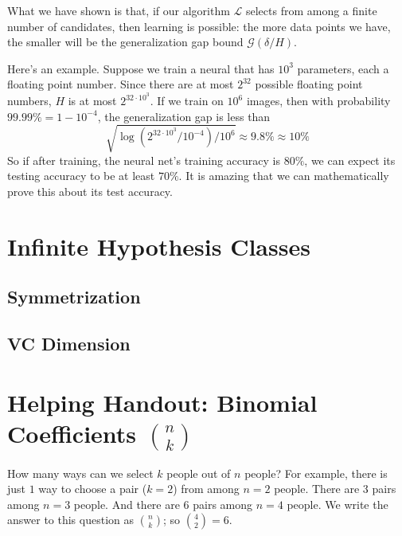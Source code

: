 \documentclass{article}
\newcommand{\Gg}{\mathcal{G}}
\newcommand{\Ll}{\mathcal{L}}
\begin{document}
            What we have shown is that, if our algorithm $\Ll$ selects from among
            a finite number of candidates, then learning is possible: the
            more data points we have, the smaller will be the generalization
            gap bound $\Gg(\delta/H)$.

            Here's an example.  Suppose we train a neural that has $10^3$
            parameters, each a floating point number.  Since there are at most
            $2^{32}$ possible floating point numbers, $H$ is at most
            $2^{32\cdot 10^3}$.  If we train on $10^6$ images, then with
            probability $99.99\%=1-10^{-4}$, the generalization gap is less
            than
            $$
                \sqrt{\log(2^{32\cdot 10^3}/10^{-4})/10^6}
                \approx 9.8\%
                \approx 10\%
            $$
            So if after training, the neural net's training accuracy is $80\%$,
            we can expect its testing accuracy to be at least $70\%$.  It is
            amazing that we can mathematically prove this about its test
            accuracy.

    \section{Infinite Hypothesis Classes}
        \subsection{Symmetrization}
        \subsection{VC Dimension}

    \section{}
    \section{}
    \section{}

    \section*{Helping Handout: Binomial Coefficients ${n \choose k}$}
        How many ways can we select $k$ people out of $n$ people?
        For example,
        there is just $1$ way to choose a pair ($k=2$) from among $n=2$ people.
        There are $3$ pairs among $n=3$ people.
        And there are $6$ pairs among $n=4$ people.
        We write the answer to this question as ${n\choose k}$; so
        ${4\choose 2} = 6$. 
        
\end{document}
